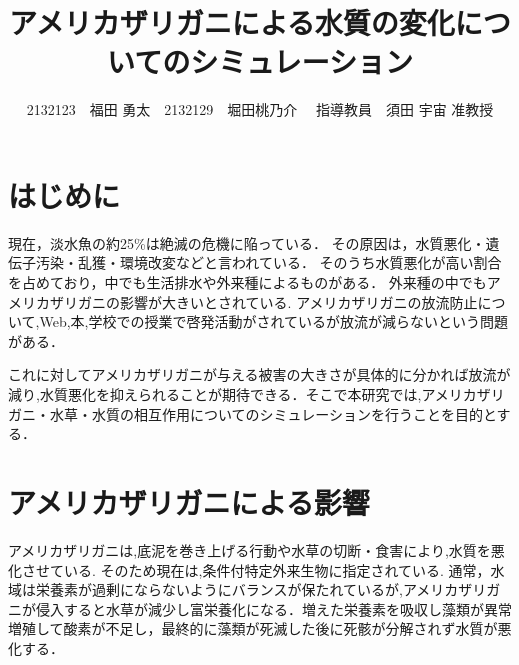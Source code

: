 \documentclass[twocolumn,10pt,a4j]{ltjsarticle}
\title{アメリカザリガニによる水質の変化についてのシミュレーション}
\author{2132123　福田 勇太　2132129　堀田桃乃介　 指導教員　須田 宇宙 准教授}
\date{}
\begin{document}
\maketitle

\section{はじめに}



現在，淡水魚の約25\%は絶滅の危機に陥っている．
その原因は，水質悪化・遺伝子汚染・乱獲・環境改変などと言われている．
そのうち水質悪化が高い割合を占めており，中でも生活排水や外来種によるものがある\cite{zetu}．
外来種の中でもアメリカザリガニの影響が大きいとされている\cite{env}.
アメリカザリガニの放流防止について,Web,本,学校での授業で啓発活動がされているが放流が減らないという問題がある．

これに対してアメリカザリガニが与える被害の大きさが具体的に分かれば放流が減り,水質悪化を抑えられることが期待できる．そこで本研究では,アメリカザリガニ・水草・水質の相互作用についてのシミュレーションを行うことを目的とする．

\section{アメリカザリガニによる影響}
アメリカザリガニは,底泥を巻き上げる行動や水草の切断・食害により,水質を悪化させている.
そのため現在は,条件付特定外来生物に指定されている.
通常，水域は栄養素が過剰にならないようにバランスが保たれているが,アメリカザリガニが侵入すると水草が減少し富栄養化になる．増えた栄養素を吸収し藻類が異常増殖して酸素が不足し，最終的に藻類が死滅した後に死骸が分解されず水質が悪化する．

\end{document}
